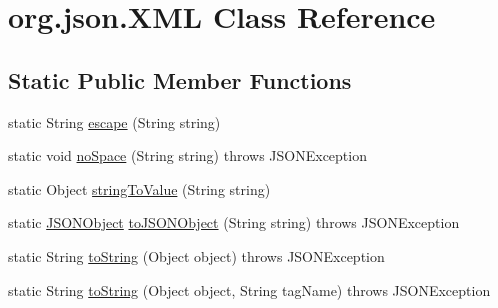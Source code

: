 \hypertarget{classorg_1_1json_1_1_x_m_l}{\section{org.\-json.\-X\-M\-L Class Reference}
\label{classorg_1_1json_1_1_x_m_l}
}
\subsection*{Static Public Member Functions}
\begin{DoxyCompactItemize}
\item 
static String \hyperlink{classorg_1_1json_1_1_x_m_l_ac7d1541b807c9c09526495fa16ab0d75}{escape} (String string)
\item 
static void \hyperlink{classorg_1_1json_1_1_x_m_l_a433875e54b5e562f14878e3e51b0caf4}{no\-Space} (String string)  throws J\-S\-O\-N\-Exception 
\item 
static Object \hyperlink{classorg_1_1json_1_1_x_m_l_ab49caaac2a830d8aa44ab26382c318f6}{string\-To\-Value} (String string)
\item 
static \hyperlink{classorg_1_1json_1_1_j_s_o_n_object}{J\-S\-O\-N\-Object} \hyperlink{classorg_1_1json_1_1_x_m_l_a31c7e87a06107fc3ec5c9a3eba318d18}{to\-J\-S\-O\-N\-Object} (String string)  throws J\-S\-O\-N\-Exception 
\item 
static String \hyperlink{classorg_1_1json_1_1_x_m_l_a4d4cd79a68a991f50707b87a7a23d02b}{to\-String} (Object object)  throws J\-S\-O\-N\-Exception 
\item 
static String \hyperlink{classorg_1_1json_1_1_x_m_l_aa09cc147aa6f0e8aa877c342efd6da23}{to\-String} (Object object, String tag\-Name)  throws J\-S\-O\-N\-Exception 
\end{DoxyCompactItemize}
